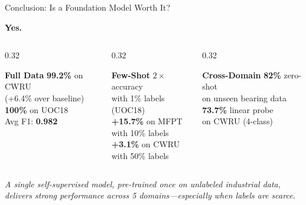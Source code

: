 \documentclass[aspectratio=169, 11pt]{beamer}
\begin{document}
\begin{frame}{Conclusion: Is a Foundation Model Worth It?}

\begin{center}
\Large\textbf{Yes.}
\end{center}

\vspace{0.3cm}
\begin{columns}[T]
\begin{column}{0.32\textwidth}
\begin{block}{\centering \textbf{Full Data}}
\centering
\textbf{99.2\%} on CWRU\\(+6.4\% over baseline)\\[4pt]
\textbf{100\%} on UOC18\\[4pt]
Avg F1: \textbf{0.982}
\end{block}
\end{column}
\begin{column}{0.32\textwidth}
\begin{block}{\centering \textbf{Few-Shot}}
\centering
\textbf{$2\times$} accuracy\\with 1\% labels (UOC18)\\[4pt]
\textbf{+15.7\%} on MFPT\\with 10\% labels\\[4pt]
\textbf{+3.1\%} on CWRU\\with 50\% labels
\end{block}
\end{column}
\begin{column}{0.32\textwidth}
\begin{block}{\centering \textbf{Cross-Domain}}
\centering
\textbf{82\%} zero-shot\\on unseen bearing data\\[4pt]
\textbf{73.7\%} linear probe\\on CWRU (4-class)
\end{block}
\end{column}
\end{columns}

\vspace{0.4cm}
\begin{center}
\textit{A single self-supervised model, pre-trained once on unlabeled industrial data,}\\
\textit{delivers strong performance across 5 domains---especially when labels are scarce.}
\end{center}
\end{frame}
\end{document}
